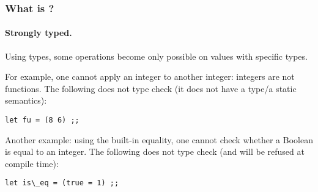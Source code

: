 \documentclass[12pt,red]{beamer}
\begin{document}
\begin{frame}
  \frametitle{What is \ML?}

  \framesubtitle{Strongly typed.}

  Using types, some operations become only possible on values with
  specific types.

  \vspace{0.2in}

  For example, one cannot apply an integer to another integer:
  integers are not functions.  The following does not type check (it
  does not have a type/a static semantics):

  \vspace*{0.05in}
  \begin{beamerboxesrounded}[upper=uppercolT,lower=lowercolT,shadow=true]{}
    \begin{center}
      \lstinline{let fu = (8 6) ;;}
    \end{center}
  \end{beamerboxesrounded}

  \vspace{0.2in}

  Another example: using the built-in equality, one cannot check
  whether a Boolean is equal to an integer.  The following does not
  type check (and will be refused at compile time):

  \vspace*{0.05in}
  \begin{beamerboxesrounded}[upper=uppercolT,lower=lowercolT,shadow=true]{}
    \begin{center}
      \lstinline{let is\_eq = (true = 1) ;;}
    \end{center}
  \end{beamerboxesrounded}

\end{frame}
\end{document}
